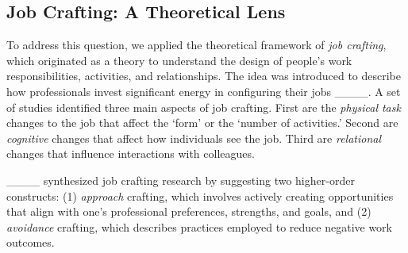 \subsection{Job Crafting: A Theoretical Lens} \label{RW-jobcrafting}
To address this question, we applied the theoretical framework of \textit{job crafting}, which originated as a theory to understand the design of people's work responsibilities, activities, and relationships. 
The idea was introduced to describe how professionals invest significant energy in configuring their jobs ____. A set of studies identified three main aspects of job crafting. First are the \textit{physical task} changes to the job that affect the `form' or the `number of activities.' Second are \textit{cognitive} changes that affect how individuals see the job. Third are \textit{relational} changes that influence interactions with colleagues. 

____ synthesized job crafting research by suggesting two higher-order constructs: (1) \textit{approach} crafting, which involves actively creating opportunities that align with one's professional preferences, strengths, and goals, and (2) \textit{avoidance} crafting, which describes practices employed to reduce negative work outcomes. 

